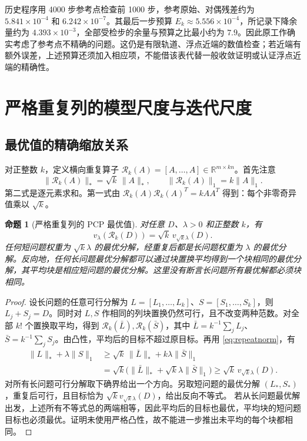\documentclass[UTF8,fontset=none,zihao=-4,a4paper]{ctexart}
\theoremstyle{plainzh}
\newtheorem{proposition}{命题}[section]
\newcommand{\R}{\mathbb R}
\newcommand{\nuc}[1]{\lVert #1\rVert_*}
\newcommand{\ellone}[1]{\lVert #1\rVert_1}
\newcommand{\rep}{\mathcal R}
\numberwithin{equation}{section}
\begin{document}
历史程序用 4000 步参考点检查前 1000 步，参考原始、对偶残差约为 $5.841\times10^{-4}$ 和 $6.242\times10^{-7}$。其最后一步预算 $E_k\approx5.556\times10^{-4}$，所记录下降余量约为 $4.393\times10^{-3}$，全部受检步的余量与预算之比最小约为 $7.9$。因此原工作确实考虑了参考点不精确的问题。这仍是有限轨道、浮点近端的数值检查；若近端有额外误差，上述预算还须加入相应项，不能借该表代替一般收敛证明或认证浮点近端的精确性。

\section{严格重复列的模型尺度与迭代尺度}
\subsection{最优值的精确缩放关系}
对正整数 $k$，定义横向重复算子
$\rep_k(A)=[A,\ldots,A]\in\R^{m\times kn}$。首先注意
\begin{equation}\label{eq:repeatnorm}
 \nuc{\rep_k(A)}=\sqrt{k}\,\nuc A,\qquad
 \ellone{\rep_k(A)}=k\ellone A.
\end{equation}
第二式是逐元素求和。第一式由
$\rep_k(A)\rep_k(A)^T=kAA^T$ 得到：每个非零奇异值乘以 $\sqrt{k}$。

\begin{proposition}[严格重复列的 PCP 最优值]\label{prop:repeat}
对任意 $D$、$\lambda>0$ 和正整数 $k$，有
\begin{equation}\label{eq:repeatvalue}
 v_\lambda(\rep_k(D))=\sqrt{k}\,v_{\sqrt{k}\lambda}(D).
\end{equation}
任何短问题权重为 $\sqrt{k}\lambda$ 的最优分解，经重复后都是长问题权重为 $\lambda$ 的最优分解。反向地，任何长问题最优分解都可以通过块置换平均得到一个块相同的最优分解，其平均块是相应短问题的最优分解。这里没有断言长问题所有最优解都必须块相同。
\end{proposition}
\begin{proof}
设长问题的任意可行分解为 $L=[L_1,\ldots,L_k]$、$S=[S_1,\ldots,S_k]$，则 $L_j+S_j=D$。同时对 $L,S$ 作相同的列块置换仍然可行，且不改变两种范数。对全部 $k!$ 个置换取平均，得到
$\rep_k(\bar L),\rep_k(\bar S)$，其中 $\bar L=k^{-1}\sum_jL_j$、$\bar S=k^{-1}\sum_jS_j$。由凸性，平均后的目标不超过原目标。再用 \eqref{eq:repeatnorm}，有
\begin{align}
 \nuc L+\lambda\ellone S
 &\geq \sqrt{k}\,\nuc{\bar L}+k\lambda\ellone{\bar S}\nonumber\\
 &=\sqrt{k}\bigl(\nuc{\bar L}+\sqrt{k}\lambda\ellone{\bar S}\bigr)
 \geq\sqrt{k}\,v_{\sqrt{k}\lambda}(D).
\end{align}
对所有长问题可行分解取下确界给出一个方向。另取短问题的最优分解 $(L_*,S_*)$，重复后可行，且目标恰为 $\sqrt{k}v_{\sqrt{k}\lambda}(D)$，给出反向不等式。
若从长问题最优解出发，上述所有不等式总的两端相等，因此平均后的目标也最优，平均块的短问题目标也必须最优。证明未使用严格凸性，故不能进一步推出未平均的每个块都相同。
\end{proof}
\end{document}
